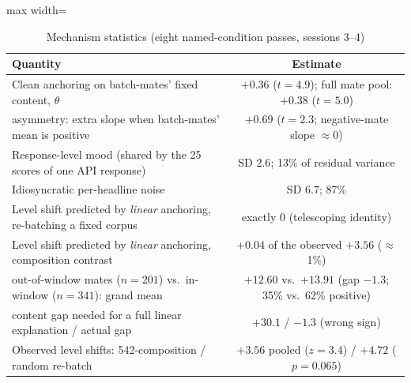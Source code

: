 \begin{table}[htbp]
\centering
\small
\caption{Mechanism statistics (eight named-condition passes, sessions 3--4)}
\label{tab:mech}
\begin{adjustbox}{max width=\textwidth}
\begin{tabular}{lc}
\toprule
Quantity & Estimate \\
\midrule
Clean anchoring on batch-mates' fixed content, $\theta$ & $+0.36$ ($t=4.9$); full mate pool: $+0.38$ ($t=5.0$) \\
\quad asymmetry: extra slope when batch-mates' mean is positive & $+0.69$ ($t=2.3$; negative-mate slope $\approx 0$) \\
Response-level mood (shared by the 25 scores of one API response) & SD $2.6$; 13\% of residual variance \\
Idiosyncratic per-headline noise & SD $6.7$; 87\% \\
Level shift predicted by \emph{linear} anchoring, re-batching a fixed corpus & exactly $0$ (telescoping identity) \\
Level shift predicted by \emph{linear} anchoring, composition contrast & $+0.04$ of the observed $+3.56$ ($\approx$1\%) \\
\quad out-of-window mates ($n=201$) vs.\ in-window ($n=341$): grand mean & $+12.60$ vs.\ $+13.91$ (gap $-1.3$; 35\% vs.\ 62\% positive) \\
\quad content gap needed for a full linear explanation / actual gap & $+30.1$ / $-1.3$ (wrong sign) \\
Observed level shifts: 542-composition / random re-batch & $+3.56$ pooled ($z=3.4$) / $+4.72$ ($p=0.065$) \\
\bottomrule
\end{tabular}
\end{adjustbox}
\begin{tablenotes}[flushleft]\footnotesize

\end{tablenotes}
\end{table}
